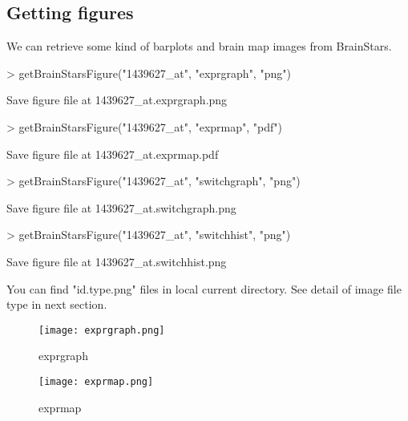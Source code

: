 \documentclass[12pt,fullpage]{article}
\begin{document}
\subsection{Getting figures}
We can retrieve some kind of barplots and brain map images from BrainStars.

\begin{Schunk}
\begin{Sinput}
> getBrainStarsFigure("1439627_at", "exprgraph",   "png")
\end{Sinput}
\begin{Soutput}
Save figure file at 1439627_at.exprgraph.png 
\end{Soutput}
\begin{Sinput}
> getBrainStarsFigure("1439627_at", "exprmap",     "pdf")
\end{Sinput}
\begin{Soutput}
Save figure file at 1439627_at.exprmap.pdf 
\end{Soutput}
\begin{Sinput}
> getBrainStarsFigure("1439627_at", "switchgraph", "png")
\end{Sinput}
\begin{Soutput}
Save figure file at 1439627_at.switchgraph.png 
\end{Soutput}
\begin{Sinput}
> getBrainStarsFigure("1439627_at", "switchhist",  "png")
\end{Sinput}
\begin{Soutput}
Save figure file at 1439627_at.switchhist.png 
\end{Soutput}
\end{Schunk}

You can find "id.type.png" files in local current directory. See detail of image file type in next section.

\begin{figure}
  \centering
  \texttt{[image: exprgraph.png]}
  \caption{exprgraph}
\end{figure}

\begin{figure}
  \centering
  \texttt{[image: exprmap.png]}
  \caption{exprmap}
\end{figure}
\end{document}
